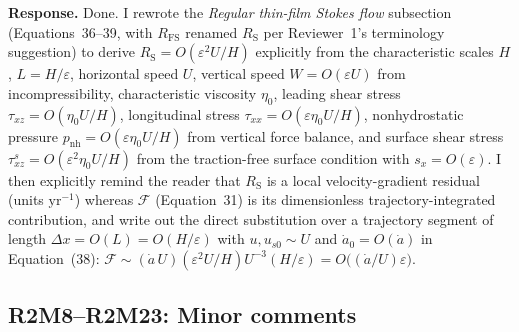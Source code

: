 \documentclass[11pt]{article}
\newcommand{\response}[1]{\noindent\textcolor{responseblue}{#1}}
\begin{document}
\response{\textbf{Response.} Done. I rewrote the \emph{Regular thin-film Stokes flow} subsection (Equations~36--39, with \(R_{\mathrm{FS}}\) renamed \(R_{\mathrm{S}}\) per Reviewer~1's terminology suggestion) to derive \(R_{\mathrm{S}}=O(\varepsilon^2 U/H)\) explicitly from the characteristic scales \(H\), \(L=H/\varepsilon\), horizontal speed \(U\), vertical speed \(W=O(\varepsilon U)\) from incompressibility, characteristic viscosity \(\eta_0\), leading shear stress \(\tau_{xz}=O(\eta_0 U/H)\), longitudinal stress \(\tau_{xx}=O(\varepsilon\eta_0 U/H)\), nonhydrostatic pressure \(p_{\mathrm{nh}}=O(\varepsilon\eta_0 U/H)\) from vertical force balance, and surface shear stress \(\tau_{xz}^{s}=O(\varepsilon^2\eta_0 U/H)\) from the traction-free surface condition with \(s_x=O(\varepsilon)\). I then explicitly remind the reader that \(R_{\mathrm{S}}\) is a local velocity-gradient residual (units \(\mathrm{yr^{-1}}\)) whereas \(\mathcal{F}\) (Equation~31) is its dimensionless trajectory-integrated contribution, and write out the direct substitution over a trajectory segment of length \(\Delta x=O(L)=O(H/\varepsilon)\) with \(u, u_{s0}\sim U\) and \(\dot a_0=O(\dot a)\) in Equation~(38): \(\mathcal{F}\sim (\dot a\,U)(\varepsilon^2 U/H) U^{-3}(H/\varepsilon)=O\bigl((\dot a/U)\varepsilon\bigr)\).}

\subsection*{R2M8--R2M23: Minor comments}
\end{document}
